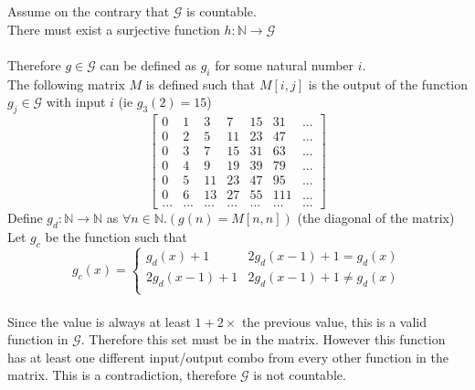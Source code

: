 \documentclass[11pt]{article}
\def\nats{{\mathbb N}}
\def\setG{{\mathscr{G}}}
\begin{document}
\begin{enumerate}
\begin{solution}
    Assume on the contrary that $\setG$ is countable.\\
    There must exist a surjective function $h: \nats\rightarrow \setG$\\\\
    Therefore $g\in \setG$ can be defined as $g_i$ for some natural number $i$.\\
    The following matrix $M$ is defined such that $M[i,j]$ is the output of the function $g_j\in\setG$ with input $i$ (ie $g_3(2) = 15$) \\
    $$
        \left[
            \begin{matrix}
                0 & 1 & 3 & 7 & 15 & 31 & ...\\
                0 & 2 & 5 & 11 & 23 & 47 & ... \\
                0 & 3 & 7 & 15 & 31 & 63 & ...\\
                0 & 4 & 9 & 19 & 39 & 79 & ...\\
                0 & 5 & 11 & 23 & 47 & 95 & ...\\
                0 & 6 & 13 & 27 & 55 & 111 & ...\\
                ... & ... & ... & ...& ...& ... & ...
            \end{matrix}
        \right]
    $$
    Define $g_d: \nats\rightarrow \nats$ as $ \forall n\in\nats. (g(n) = M[n,n])$ (the diagonal of the matrix)\\
    Let $g_c$ be the function such that
    $$g_c(x) =\begin{cases}
        g_d(x) + 1 & 2g_d(x-1) +1  = g_d(x)\\
        2g_d(x-1) + 1 & 2g_d(x-1) + 1 \ne g_d(x)  \\
    \end{cases}$$  \\
    Since the value is always at least $1 + 2\times$ the previous value, this is a valid function in $\setG$. Therefore this set must be in the matrix. However this function has at least one different input/output combo from every other function in the matrix. This is a contradiction, therefore $\setG$ is not countable.
\end{solution}
\end{enumerate}
\end{document}
